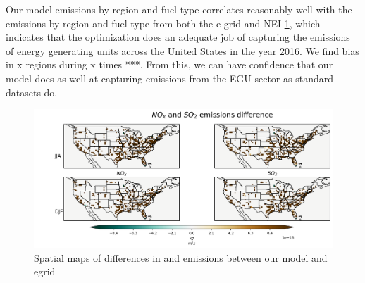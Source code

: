\documentclass[12]{article}
\begin{document}
Our model emissions by region and fuel-type correlates reasonably well with the emissions by region and fuel-type from both the e-grid and NEI \ref{fig:emissions}, which indicates that the optimization does an adequate job of capturing the emissions of energy generating units across the United States in the year 2016. We find bias in x regions during x times ***. From this, we can have confidence that our model does as well at capturing emissions from the EGU sector as standard datasets do. 

\begin{figure}
    \centering
    \includegraphics[scale=0.4]{ego_nonuclear_project/Figures/summer_nox_emissions.png}
    \caption{Spatial maps of differences in  and  emissions between our model and egrid} 
    \label{fig:emissions}
\end{figure}
\end{document}
